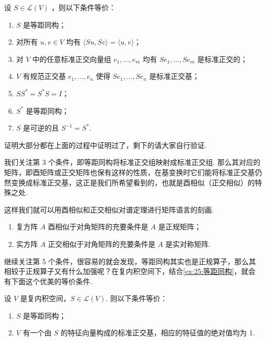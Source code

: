 \begin{theorem}
    设 $ S \in \mathcal{L}(V) $ ，则以下条件等价：
    \begin{enumerate}
        \item $ S $ 是等距同构；

        \item 对所有 $ u, v \in V $ 均有 $ \langle Su, Sv \rangle = \langle u, v \rangle $；

        \item 对 $ V $ 中的任意标准正交向量组 $ e_1, \ldots , e_m $ 均有 $ Se_1, \ldots , Se_m $ 是标准正交的；

        \item $ V $ 有规范正交基 $ e_1, \ldots ,e_n $ 使得 $ Se_1, \ldots , Se_n $ 是标准正交基；

        \item $ SS^* = S^*S = I $；

        \item $ S^* $ 是等距同构；

        \item $ S $ 是可逆的且 $ S^{-1} = S^* $.
    \end{enumerate}
\end{theorem}

证明大部分都在上面的过程中证明过了，剩下的请大家自行验证.

我们关注第 3 个条件，即等距同构将标准正交组映射成标准正交组. 那么其对应的矩阵，即酉矩阵或正交矩阵也保有这样的性质，在基变换时它们能将标准正交基仍然变换成标准正交基，这正是我们所希望看到的，也就是酉相似（正交相似）的特殊之处.

这样我们就可以用酉相似和正交相似对谱定理进行矩阵语言的刻画.

\begin{theorem}
    \begin{enumerate}
        \item 复方阵 $ A $ 酉相似于对角矩阵的充要条件是 $ A $ 是正规矩阵；

        \item 实方阵 $ A $ 正交相似于对角矩阵的充要条件是 $ A $ 是实对称矩阵.
    \end{enumerate}
\end{theorem}

继续关注第 5 个条件，很容易的就会发现，等距同构其实也是正规算子，那么其相较于正规算子又有什么加强呢？在复内积空间下，结合\autoref{ex:25:等距同构}，就会有下面这个优美的等价条件.

\begin{theorem}
    设 $ V $ 是复内积空间，$ S \in \mathcal{L}(V) $. 则以下条件等价：
    \begin{enumerate}
        \item $ S $ 是等距同构；

        \item $ V $ 有一个由 $ S $ 的特征向量构成的标准正交基，相应的特征值的绝对值均为 1.
    \end{enumerate}
\end{theorem}

